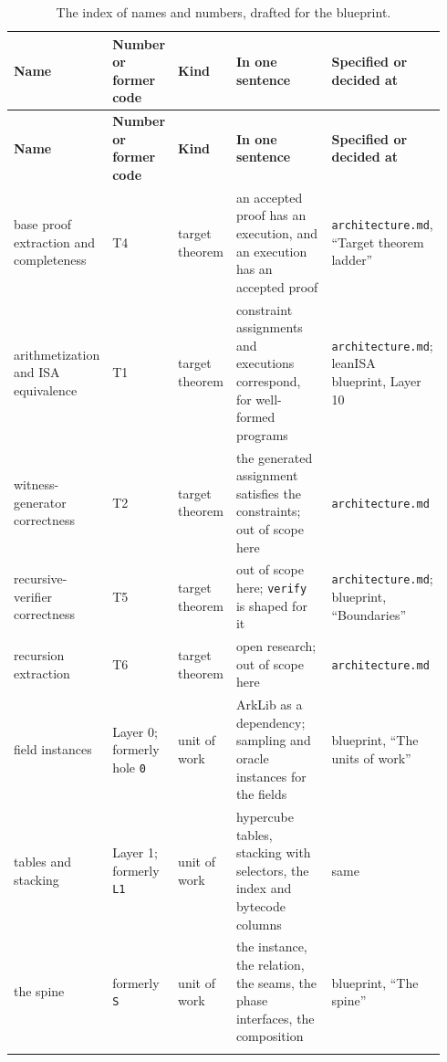 {\footnotesize\setlength{\tabcolsep}{3pt}
\begin{longtable}{@{}>{\raggedright\arraybackslash}p{0.208\linewidth}>{\raggedright\arraybackslash}p{0.141\linewidth}>{\raggedright\arraybackslash}p{0.104\linewidth}>{\raggedright\arraybackslash}p{0.292\linewidth}>{\raggedright\arraybackslash}p{0.198\linewidth}@{}}
\caption{The index of names and numbers, drafted for the blueprint.}\label{tab:docs-index-draft}\\
\toprule
\textbf{Name} & \textbf{Number or former code} & \textbf{Kind} & \textbf{In one sentence} & \textbf{Specified or decided at} \\
\midrule
\endfirsthead
\toprule
\textbf{Name} & \textbf{Number or former code} & \textbf{Kind} & \textbf{In one sentence} & \textbf{Specified or decided at} \\
\midrule
\endhead
\bottomrule
\endfoot
base proof extraction and completeness & T4 & target theorem & an accepted proof has an execution, and an execution has an accepted proof & \texttt{architecture.\allowbreak{}md}, ``Target theorem ladder'' \\\addlinespace[2pt]
arithmetization and ISA equivalence & T1 & target theorem & constraint assignments and executions correspond, for well-formed programs & \texttt{architecture.\allowbreak{}md}; leanISA blueprint, Layer 10 \\\addlinespace[2pt]
witness-generator correctness & T2 & target theorem & the generated assignment satisfies the constraints; out of scope here & \texttt{architecture.\allowbreak{}md} \\\addlinespace[2pt]
recursive-verifier correctness & T5 & target theorem & out of scope here; \texttt{verify} is shaped for it & \texttt{architecture.\allowbreak{}md}; blueprint, ``Boundaries'' \\\addlinespace[2pt]
recursion extraction & T6 & target theorem & open research; out of scope here & \texttt{architecture.\allowbreak{}md} \\\addlinespace[2pt]
field instances & Layer 0; formerly hole \texttt{0} & unit of work & ArkLib as a dependency; sampling and oracle instances for the fields & blueprint, ``The units of work'' \\\addlinespace[2pt]
tables and stacking & Layer 1; formerly \texttt{L1} & unit of work & hypercube tables, stacking with selectors, the index and bytecode columns & same \\\addlinespace[2pt]
the spine & formerly \texttt{S} & unit of work & the instance, the relation, the seams, the phase interfaces, the composition & blueprint, ``The spine'' \\\addlinespace[2pt]

\end{longtable}}
